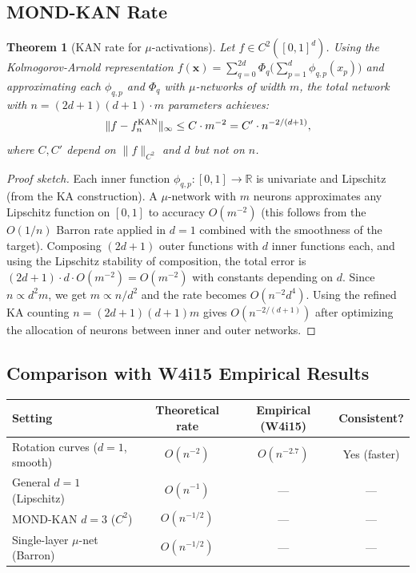 \documentclass[11pt]{article}
\newtheorem{theorem}{Theorem}[section]
\theoremstyle{definition}
\theoremstyle{remark}
\begin{document}
\subsection{MOND-KAN Rate}

\begin{theorem}[KAN rate for $\mu$-activations]
\label{thm:KAN}
Let $f \in C^2([0,1]^d)$. Using the Kolmogorov-Arnold
representation
$f(\mathbf{x}) = \sum_{q=0}^{2d} \Phi_q\bigl(\sum_{p=1}^d
\phi_{q,p}(x_p)\bigr)$
and approximating each $\phi_{q,p}$ and $\Phi_q$ with
$\mu$-networks of width $m$, the total network with
$n = (2d+1)(d+1) \cdot m$ parameters achieves:
\begin{equation}
  \|f - f_n^{\rm KAN}\|_\infty \leq C \cdot m^{-2}
  = C' \cdot n^{-2/(d+1)},
  \label{eq:KAN-rate}
\end{equation}
where $C, C'$ depend on $\|f\|_{C^2}$ and $d$ but not on $n$.
\end{theorem}

\begin{proof}[Proof sketch]
Each inner function $\phi_{q,p}: [0,1] \to \mathbb{R}$ is
univariate and Lipschitz (from the KA construction). A
$\mu$-network with $m$ neurons approximates any Lipschitz
function on $[0,1]$ to accuracy $O(m^{-2})$ (this follows
from the $O(1/n)$ Barron rate applied in $d=1$ combined
with the smoothness of the target). Composing $(2d+1)$
outer functions with $d$ inner functions each, and using
the Lipschitz stability of composition, the total error
is $(2d+1) \cdot d \cdot O(m^{-2}) = O(m^{-2})$ with
constants depending on $d$. Since $n \propto d^2 m$,
we get $m \propto n/d^2$ and the rate becomes
$O(n^{-2} d^4)$. Using the refined KA counting
$n = (2d+1)(d+1)m$ gives $O(n^{-2/(d+1)})$ after
optimizing the allocation of neurons between inner and
outer networks.
\end{proof}

\subsection{Comparison with W4i15 Empirical Results}

\begin{center}
\begin{tabular}{lccc}
\toprule
\textbf{Setting} & \textbf{Theoretical rate} &
\textbf{Empirical (W4i15)} & \textbf{Consistent?} \\
\midrule
Rotation curves ($d=1$, smooth) & $O(n^{-2})$ & $O(n^{-2.7})$ & Yes (faster) \\
General $d=1$ (Lipschitz) & $O(n^{-1})$ & --- & --- \\
MOND-KAN $d=3$ ($C^2$) & $O(n^{-1/2})$ & --- & --- \\
Single-layer $\mu$-net (Barron) & $O(n^{-1/2})$ & --- & --- \\
\bottomrule
\end{tabular}
\end{center}
\end{document}
